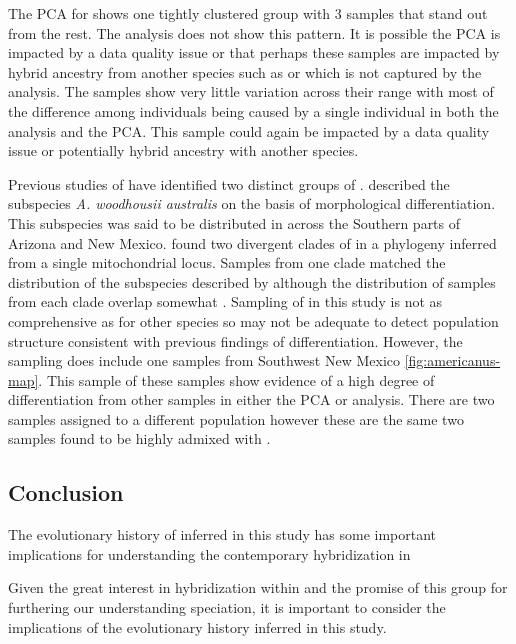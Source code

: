 The PCA for \fowl shows one tightly clustered group with 3 samples that 
stand out from the rest.
The \structure analysis does not show this pattern.
It is possible the PCA is impacted by a data quality issue or that perhaps 
these samples are impacted by hybrid ancestry from another species such 
as \fowl or \amer which is not captured by the \structure analysis.
The \fowl samples show very little variation across their range with most 
of the difference among individuals being caused by a single individual in
both the \structure analysis and the PCA.
This sample could again be impacted by a data quality issue or potentially 
hybrid ancestry with another species.

Previous studies of \wood have identified two distinct groups of \wood. 
\cite{shannon1955} described the subspecies \textit{A. woodhousii australis} 
on the basis of morphological differentiation.
This subspecies was said to be distributed in across the Southern parts of Arizona
and New Mexico. 
\cite{masta2003} found two divergent clades of \wood in a phylogeny inferred 
from a single mitochondrial locus. 
Samples from one clade matched the distribution of the subspecies described 
by although the distribution of samples from each clade overlap somewhat \cite{shannon1955,masta2003}.
Sampling of \wood in this study is not as comprehensive as for other species
so may not be adequate to detect population structure consistent with 
previous findings of differentiation. However, the sampling does include 
one samples from Southwest New Mexico \cref{fig:americanus-map}.
This sample of these samples show evidence of a high degree of differentiation 
from other samples in either the PCA or \structure analysis. 
There are two samples assigned to a different population however these are the 
same two samples found to be highly admixed with \fowl. 


\subsection{Conclusion}
The evolutionary history of \anaxyrus inferred in this study has some important 
implications for understanding the contemporary hybridization in \anaxyrus


Given the great interest in hybridization within \anaxyrus and the promise of this 
group for furthering our understanding speciation, it is important to consider the 
implications of the evolutionary history inferred in this study.


